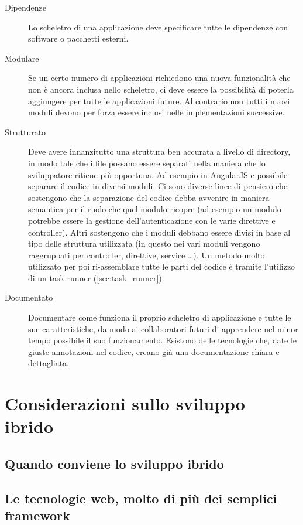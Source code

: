 \begin{description}
\item[Dipendenze] Lo scheletro di una applicazione deve specificare tutte le dipendenze con software o pacchetti esterni.

\item[Modulare] Se un certo numero di applicazioni richiedono una nuova funzionalità che non è ancora inclusa nello scheletro, ci deve essere la possibilità di poterla aggiungere per tutte le applicazioni future. Al contrario non tutti i nuovi moduli devono per forza essere inclusi nelle implementazioni successive.

\item[Strutturato] Deve avere innanzitutto una struttura ben accurata a livello di directory, in modo tale che i file possano essere separati nella maniera che lo sviluppatore ritiene più opportuna. Ad esempio in AngularJS e possibile separare il codice in diversi moduli. Ci sono diverse linee di pensiero che sostengono che la separazione del codice debba avvenire in maniera semantica per il ruolo che quel modulo ricopre (ad esempio un modulo potrebbe essere la gestione dell'autenticazione con le varie direttive e controller). Altri sostengono che i moduli debbano essere divisi in base al tipo delle struttura utilizzata (in questo nei vari moduli vengono raggruppati per controller, direttive, service \ldots).
Un metodo molto utilizzato per poi ri-assemblare tutte le parti del codice è tramite l'utilizzo di un task-runner (\ref{sec:task_runner}).

\item[Documentato] Documentare come funziona il proprio scheletro di applicazione e tutte le sue caratteristiche, da modo ai collaboratori futuri di apprendere nel minor tempo possibile il suo funzionamento. Esistono delle tecnologie che, date le giuste annotazioni nel codice, creano già una documentazione chiara e dettagliata.
\end{description} 


\section{Considerazioni sullo sviluppo ibrido}

\subsection{Quando conviene lo sviluppo ibrido}

\subsection{Le tecnologie web, molto di più dei semplici framework}

